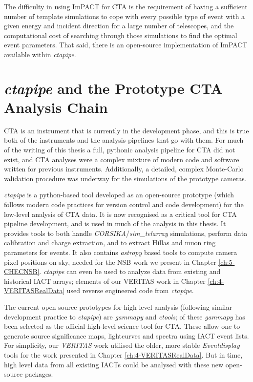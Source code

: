 The difficulty in using ImPACT for CTA is the requirement of having a sufficient number of template simulations to cope with every possible type of event with a given energy and incident direction for a large number of telescopes, and the computational cost of searching through those simulations to find the optimal event parameters. That said, there is an open-source implementation of ImPACT available within \textit{ctapipe}.

\section{\textit{ctapipe} and the Prototype CTA Analysis Chain}

CTA is an instrument that is currently in the development phase, and this is true both of the instruments and the analysis pipelines that go with them. For much of the writing of this thesis a full, pythonic analysis pipeline for CTA did not exist, and CTA analyses were a complex mixture of modern code and software written for previous instruments. Additionally, a detailed, complex Monte-Carlo validation procedure was underway for the simulations of the prototype cameras.

\textit{ctapipe} is a python-based tool developed as an open-source prototype (which follows modern code practices for version control and code development) for the low-level analysis of CTA data. It is now recognised as a critical tool for CTA pipeline development, and is used in much of the analysis in this thesis. It provides tools to both handle \textit{CORSIKA}/\textit{sim\_telarray} simulations, perform data calibration and charge extraction, and to extract Hillas and muon ring parameters for events. It also contains \textit{astropy} based tools to compute camera pixel positions on sky, needed for the NSB work we present in Chapter \ref{ch:5-CHECNSB}. \textit{ctapipe} can even be used to analyze data from existing and historical IACT arrays; elements of our VERITAS work in Chapter \ref{ch:4-VERITASRealData} used reverse engineered code from \textit{ctapipe}.

The current open-source prototypes for high-level analysis (following similar development practice to \textit{ctapipe}) are \textit{gammapy} and \textit{ctools}; of these \textit{gammapy} has been selected as the official high-level science tool for CTA. These allow one to generate source significance maps, lightcurves and spectra using IACT event lists. For simplicity, our \textit{VERITAS} work utilised the older, more stable \textit{Eventdisplay} tools for the work presented in Chapter \ref{ch:4-VERITASRealData}. But in time, high level data from all existing IACTs could be analysed with these new open-source packages.

